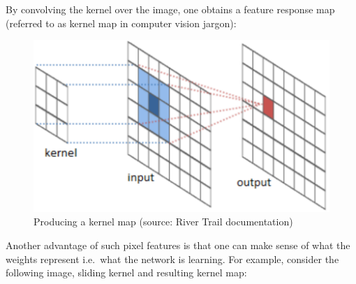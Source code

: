 \documentclass[a4paper,11pt]{article}
\begin{document}
By convolving the kernel over the image, one obtains a feature response map (referred to as kernel map in computer vision jargon):

\begin{figure}[h!]
	\centering
	\includegraphics[scale=0.3]{images/kernel_map.png}
	\caption{Producing a kernel map (source: River Trail documentation)}
\end{figure}

Another advantage of such pixel features is that one can make sense of what the weights represent i.e.\ what the network is learning. For example, consider the following image, sliding kernel and resulting kernel map:
\end{document}
